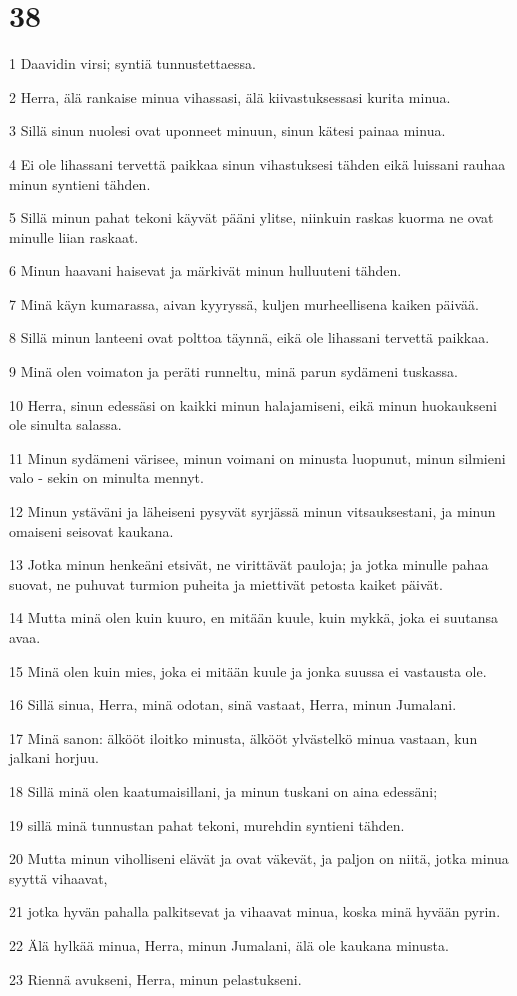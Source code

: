 \chapter{38}

\par 1 Daavidin virsi; syntiä tunnustettaessa.
\par 2 Herra, älä rankaise minua vihassasi, älä kiivastuksessasi kurita minua.
\par 3 Sillä sinun nuolesi ovat uponneet minuun, sinun kätesi painaa minua.
\par 4 Ei ole lihassani tervettä paikkaa sinun vihastuksesi tähden eikä luissani rauhaa minun syntieni tähden.
\par 5 Sillä minun pahat tekoni käyvät pääni ylitse, niinkuin raskas kuorma ne ovat minulle liian raskaat.
\par 6 Minun haavani haisevat ja märkivät minun hulluuteni tähden.
\par 7 Minä käyn kumarassa, aivan kyyryssä, kuljen murheellisena kaiken päivää.
\par 8 Sillä minun lanteeni ovat polttoa täynnä, eikä ole lihassani tervettä paikkaa.
\par 9 Minä olen voimaton ja peräti runneltu, minä parun sydämeni tuskassa.
\par 10 Herra, sinun edessäsi on kaikki minun halajamiseni, eikä minun huokaukseni ole sinulta salassa.
\par 11 Minun sydämeni värisee, minun voimani on minusta luopunut, minun silmieni valo - sekin on minulta mennyt.
\par 12 Minun ystäväni ja läheiseni pysyvät syrjässä minun vitsauksestani, ja minun omaiseni seisovat kaukana.
\par 13 Jotka minun henkeäni etsivät, ne virittävät pauloja; ja jotka minulle pahaa suovat, ne puhuvat turmion puheita ja miettivät petosta kaiket päivät.
\par 14 Mutta minä olen kuin kuuro, en mitään kuule, kuin mykkä, joka ei suutansa avaa.
\par 15 Minä olen kuin mies, joka ei mitään kuule ja jonka suussa ei vastausta ole.
\par 16 Sillä sinua, Herra, minä odotan, sinä vastaat, Herra, minun Jumalani.
\par 17 Minä sanon: älkööt iloitko minusta, älkööt ylvästelkö minua vastaan, kun jalkani horjuu.
\par 18 Sillä minä olen kaatumaisillani, ja minun tuskani on aina edessäni;
\par 19 sillä minä tunnustan pahat tekoni, murehdin syntieni tähden.
\par 20 Mutta minun viholliseni elävät ja ovat väkevät, ja paljon on niitä, jotka minua syyttä vihaavat,
\par 21 jotka hyvän pahalla palkitsevat ja vihaavat minua, koska minä hyvään pyrin.
\par 22 Älä hylkää minua, Herra, minun Jumalani, älä ole kaukana minusta.
\par 23 Riennä avukseni, Herra, minun pelastukseni.

